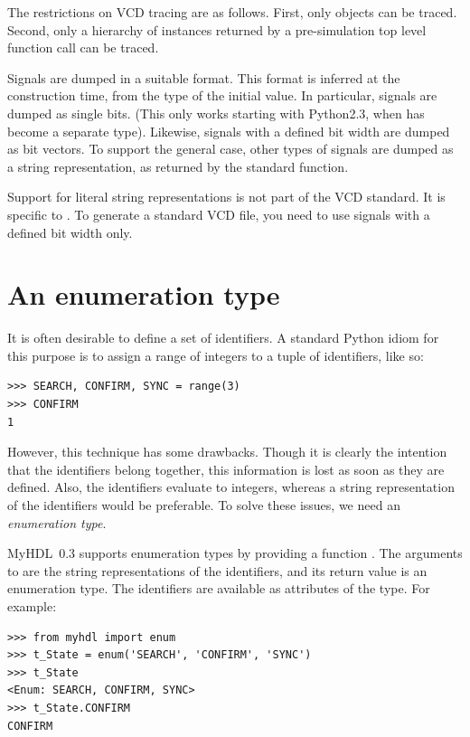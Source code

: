 \documentclass{howto}
\newcommand{\myhdl}{\protect \mbox{MyHDL}}
\begin{document}
The restrictions on VCD tracing are as follows. First, only
 objects can be traced. Second, only a hierarchy of
instances returned by a pre-simulation top level function call can be
traced.

Signals are dumped in a suitable format. This format is inferred at
the  construction time, from the type of the initial
value. In particular,  signals are dumped as single
bits. (This only works starting with Python2.3, when  has
become a separate type).  Likewise,  signals with a
defined bit width are dumped as bit vectors. To support the general
case, other types of signals are dumped as a string representation, as
returned by the standard  function.

\begin{notice}[warning]
Support for literal string representations is not part of the VCD
standard. It is specific to . To generate a
standard VCD file, you need to use signals with a defined bit width
only.
\end{notice}

\section{An enumeration type\label{section-enum}}

It is often desirable to define a set of identifiers.  A standard
Python idiom for this purpose is to assign a range of integers to a
tuple of identifiers, like so:

\begin{verbatim}
>>> SEARCH, CONFIRM, SYNC = range(3)
>>> CONFIRM
1
\end{verbatim}

However, this technique has some drawbacks. Though it is clearly
the intention that the identifiers belong together, this information
is lost as soon as they are defined. Also, the identifiers evaluate to
integers, whereas a string representation of the identifiers
would be preferable. To solve these issues, we need an
\emph{enumeration type}.

\myhdl\ 0.3 supports enumeration types by providing a function
.  The arguments to  are the string
representations of the identifiers, and its return value is an
enumeration type. The identifiers are available as attributes of the
type. For example:

\begin{verbatim}
>>> from myhdl import enum
>>> t_State = enum('SEARCH', 'CONFIRM', 'SYNC')
>>> t_State
<Enum: SEARCH, CONFIRM, SYNC>
>>> t_State.CONFIRM
CONFIRM
\end{verbatim}
\end{document}
